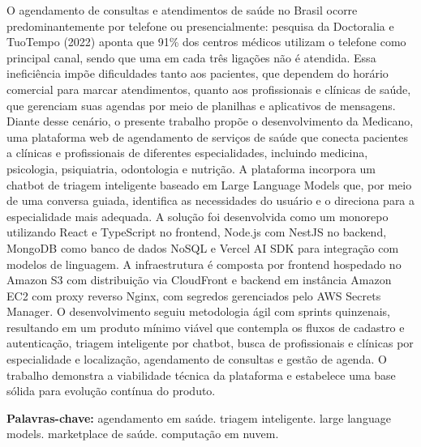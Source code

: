 \begin{resumo}
  O agendamento de consultas e atendimentos de saúde no Brasil
  ocorre predominantemente por telefone ou presencialmente:
  pesquisa da Doctoralia e TuoTempo (2022) aponta que 91\% dos
  centros médicos utilizam o telefone como principal canal,
  sendo que uma em cada três ligações não é atendida. Essa
  ineficiência impõe dificuldades tanto aos pacientes, que
  dependem do horário comercial para marcar atendimentos,
  quanto aos profissionais e clínicas de saúde, que gerenciam
  suas agendas por meio de planilhas e aplicativos de mensagens.
  Diante desse cenário, o presente trabalho propõe o
  desenvolvimento da Medicano, uma plataforma web de agendamento
  de serviços de saúde que conecta pacientes a clínicas e
  profissionais de diferentes especialidades, incluindo medicina,
  psicologia, psiquiatria, odontologia e nutrição. A plataforma
  incorpora um chatbot de triagem inteligente baseado em Large
  Language Models que, por meio de uma conversa guiada, identifica
  as necessidades do usuário e o direciona para a especialidade
  mais adequada. A solução foi desenvolvida como um monorepo
  utilizando React e TypeScript no frontend, Node.js com NestJS
  no backend, MongoDB como banco de dados NoSQL e Vercel AI SDK
  para integração com modelos de linguagem. A infraestrutura é
  composta por frontend hospedado no Amazon S3 com distribuição
  via CloudFront e backend em instância Amazon EC2 com proxy
  reverso Nginx, com segredos gerenciados pelo AWS Secrets
  Manager. O desenvolvimento seguiu metodologia ágil com sprints
  quinzenais, resultando em um produto mínimo viável que
  contempla os fluxos de cadastro e autenticação, triagem
  inteligente por chatbot, busca de profissionais e clínicas
  por especialidade e localização, agendamento de consultas e
  gestão de agenda. O trabalho demonstra a viabilidade técnica
  da plataforma e estabelece uma base sólida para evolução
  contínua do produto.

  \vspace{\onelineskip}
  \noindent\textbf{Palavras-chave:}
  agendamento em saúde. triagem inteligente. large language
  models. marketplace de saúde. computação em nuvem.
\end{resumo}